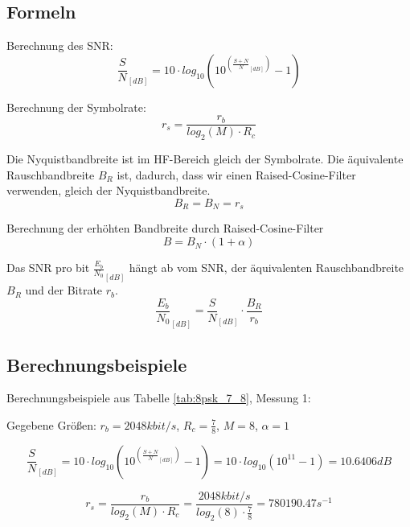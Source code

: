 \documentclass[12pt,a4paper,ngerman]{article}
\begin{document}
\subsection{Formeln}

Berechnung des SNR:
\begin{equation}\label{eq:snr_db}
 \frac{S}{N}_{[dB]} = 10 \cdot log_{10}(10^{(\frac{S+N}{N}_{[dB]})} -1) 
\end{equation}


Berechnung der Symbolrate:
\begin{equation}\label{eq:rs_formula}
 r_s = \frac{r_b}{log_2(M) \cdot R_c}
\end{equation}

Die Nyquistbandbreite ist im HF-Bereich gleich der Symbolrate. Die äquivalente Rauschbandbreite $B_R$ ist, dadurch, dass wir einen Raised-Cosine-Filter verwenden, gleich der Nyquistbandbreite.
\begin{equation}\label{eq:bn_rs_formula}
 B_R = B_N = r_s
\end{equation}

Berechnung der erhöhten Bandbreite durch Raised-Cosine-Filter
\begin{equation}
 B = B_N \cdot (1 + \alpha)
\end{equation}

Das SNR pro bit $\frac{E_b}{N_0}_{[dB]}$ hängt ab vom SNR, der äquivalenten Rauschbandbreite $B_R$ und der Bitrate $r_b$.
\begin{equation}
 \frac{E_b}{N_0}_{[dB]} = \frac{S}{N}_{[dB]} \cdot \frac{B_R}{r_b} 
\end{equation}



\subsection{Berechnungsbeispiele}

Berechnungsbeispiele aus Tabelle \ref{tab:8psk_7_8}, Messung 1:

Gegebene Größen: $r_b = 2048 kbit/s$, $R_c = \frac{7}{8}$, $M = 8$, $\alpha = 1$

\begin{equation}
 \frac{S}{N}_{[dB]} = 10 \cdot log_{10}(10^{(\frac{S+N}{N}_{[dB]})} -1) =  10 \cdot log_{10}(10^{11} -1) = 10.6406 dB
\end{equation}

\begin{equation}
 r_s = \frac{r_b}{log_2(M) \cdot R_c} = \frac{2048 kbit/s}{log_2(8) \cdot \frac{7}{8}} = 780190.47 s^{-1}
\end{equation}
\end{document}
